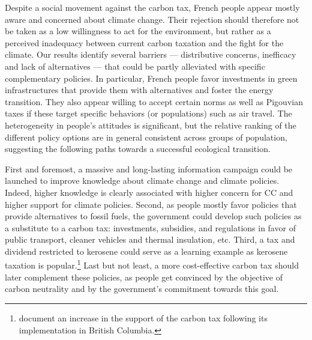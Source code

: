 \documentclass[english,5p,authoryear]{elsarticle}
\begin{document}
Despite a social movement against the carbon tax, French people appear mostly aware and concerned about climate change. Their rejection should therefore not be taken as a low willingness to act for the environment, but rather as a perceived inadequacy between current carbon taxation and the fight for the climate. Our results identify several barriers --- distributive concerns, inefficacy and lack of alternatives --- that could be partly alleviated with specific complementary policies. In particular, French people favor investments in green infrastructures that provide them with alternatives and foster the energy transition. They also appear willing to accept certain norms as well as Pigouvian taxes if these target specific behaviors (or populations) such as air travel. The heterogeneity in people's attitudes is significant, but the relative ranking of the different policy options are in general consistent across groups of population, suggesting the following paths towards a successful ecological transition.


First and foremost, a massive and long-lasting information campaign could be launched to improve knowledge about climate change and climate policies. Indeed, higher knowledge is clearly associated with higher concern for CC and higher support for climate policies. Second, as people mostly favor policies that provide alternatives to fossil fuels, the government could develop such policies as a substitute to a carbon tax: investments, subsidies, and regulations in favor of public transport, cleaner vehicles and thermal insulation, etc. Third, a tax and dividend restricted to kerosene could serve as a learning example as kerosene taxation is popular.\footnote{\citet{murray_british_2015} document an increase in the support of the carbon tax following its implementation in British Columbia.} Last but not least, a more cost-effective carbon tax should later complement these policies, as people get convinced by the objective of carbon neutrality and by the government's commitment towards this goal. 
\end{document}
